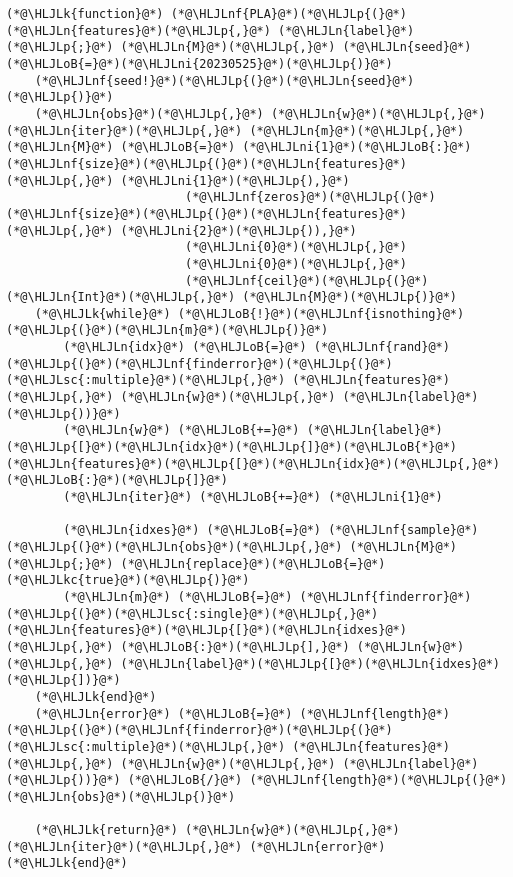 \documentclass[12pt,a4paper]{article}
\newcommand{\HLJLk}[1]{\textcolor[RGB]{148,91,176}{\textbf{#1}}}
\newcommand{\HLJLkc}[1]{\textcolor[RGB]{59,151,46}{\textit{#1}}}
\newcommand{\HLJLn}[1]{#1}
\newcommand{\HLJLnf}[1]{\textcolor[RGB]{66,102,213}{#1}}
\newcommand{\HLJLsc}[1]{\textcolor[RGB]{201,61,57}{#1}}
\newcommand{\HLJLni}[1]{\textcolor[RGB]{59,151,46}{#1}}
\newcommand{\HLJLoB}[1]{\textcolor[RGB]{102,102,102}{\textbf{#1}}}
\newcommand{\HLJLp}[1]{#1}
\begin{document}
\begin{lstlisting}
(*@\HLJLk{function}@*) (*@\HLJLnf{PLA}@*)(*@\HLJLp{(}@*)(*@\HLJLn{features}@*)(*@\HLJLp{,}@*) (*@\HLJLn{label}@*)(*@\HLJLp{;}@*) (*@\HLJLn{M}@*)(*@\HLJLp{,}@*) (*@\HLJLn{seed}@*)(*@\HLJLoB{=}@*)(*@\HLJLni{20230525}@*)(*@\HLJLp{)}@*)
    (*@\HLJLnf{seed!}@*)(*@\HLJLp{(}@*)(*@\HLJLn{seed}@*)(*@\HLJLp{)}@*)
    (*@\HLJLn{obs}@*)(*@\HLJLp{,}@*) (*@\HLJLn{w}@*)(*@\HLJLp{,}@*) (*@\HLJLn{iter}@*)(*@\HLJLp{,}@*) (*@\HLJLn{m}@*)(*@\HLJLp{,}@*) (*@\HLJLn{M}@*) (*@\HLJLoB{=}@*) (*@\HLJLni{1}@*)(*@\HLJLoB{:}@*)(*@\HLJLnf{size}@*)(*@\HLJLp{(}@*)(*@\HLJLn{features}@*)(*@\HLJLp{,}@*) (*@\HLJLni{1}@*)(*@\HLJLp{),}@*) 
                         (*@\HLJLnf{zeros}@*)(*@\HLJLp{(}@*)(*@\HLJLnf{size}@*)(*@\HLJLp{(}@*)(*@\HLJLn{features}@*)(*@\HLJLp{,}@*) (*@\HLJLni{2}@*)(*@\HLJLp{)),}@*) 
                         (*@\HLJLni{0}@*)(*@\HLJLp{,}@*) 
                         (*@\HLJLni{0}@*)(*@\HLJLp{,}@*)
                         (*@\HLJLnf{ceil}@*)(*@\HLJLp{(}@*)(*@\HLJLn{Int}@*)(*@\HLJLp{,}@*) (*@\HLJLn{M}@*)(*@\HLJLp{)}@*)
    (*@\HLJLk{while}@*) (*@\HLJLoB{!}@*)(*@\HLJLnf{isnothing}@*)(*@\HLJLp{(}@*)(*@\HLJLn{m}@*)(*@\HLJLp{)}@*)
        (*@\HLJLn{idx}@*) (*@\HLJLoB{=}@*) (*@\HLJLnf{rand}@*)(*@\HLJLp{(}@*)(*@\HLJLnf{finderror}@*)(*@\HLJLp{(}@*)(*@\HLJLsc{:multiple}@*)(*@\HLJLp{,}@*) (*@\HLJLn{features}@*)(*@\HLJLp{,}@*) (*@\HLJLn{w}@*)(*@\HLJLp{,}@*) (*@\HLJLn{label}@*)(*@\HLJLp{))}@*)
        (*@\HLJLn{w}@*) (*@\HLJLoB{+=}@*) (*@\HLJLn{label}@*)(*@\HLJLp{[}@*)(*@\HLJLn{idx}@*)(*@\HLJLp{]}@*)(*@\HLJLoB{*}@*)(*@\HLJLn{features}@*)(*@\HLJLp{[}@*)(*@\HLJLn{idx}@*)(*@\HLJLp{,}@*) (*@\HLJLoB{:}@*)(*@\HLJLp{]}@*)
        (*@\HLJLn{iter}@*) (*@\HLJLoB{+=}@*) (*@\HLJLni{1}@*)

        (*@\HLJLn{idxes}@*) (*@\HLJLoB{=}@*) (*@\HLJLnf{sample}@*)(*@\HLJLp{(}@*)(*@\HLJLn{obs}@*)(*@\HLJLp{,}@*) (*@\HLJLn{M}@*)(*@\HLJLp{;}@*) (*@\HLJLn{replace}@*)(*@\HLJLoB{=}@*)(*@\HLJLkc{true}@*)(*@\HLJLp{)}@*)
        (*@\HLJLn{m}@*) (*@\HLJLoB{=}@*) (*@\HLJLnf{finderror}@*)(*@\HLJLp{(}@*)(*@\HLJLsc{:single}@*)(*@\HLJLp{,}@*) (*@\HLJLn{features}@*)(*@\HLJLp{[}@*)(*@\HLJLn{idxes}@*)(*@\HLJLp{,}@*) (*@\HLJLoB{:}@*)(*@\HLJLp{],}@*) (*@\HLJLn{w}@*)(*@\HLJLp{,}@*) (*@\HLJLn{label}@*)(*@\HLJLp{[}@*)(*@\HLJLn{idxes}@*)(*@\HLJLp{])}@*)
    (*@\HLJLk{end}@*)
    (*@\HLJLn{error}@*) (*@\HLJLoB{=}@*) (*@\HLJLnf{length}@*)(*@\HLJLp{(}@*)(*@\HLJLnf{finderror}@*)(*@\HLJLp{(}@*)(*@\HLJLsc{:multiple}@*)(*@\HLJLp{,}@*) (*@\HLJLn{features}@*)(*@\HLJLp{,}@*) (*@\HLJLn{w}@*)(*@\HLJLp{,}@*) (*@\HLJLn{label}@*)(*@\HLJLp{))}@*) (*@\HLJLoB{/}@*) (*@\HLJLnf{length}@*)(*@\HLJLp{(}@*)(*@\HLJLn{obs}@*)(*@\HLJLp{)}@*)

    (*@\HLJLk{return}@*) (*@\HLJLn{w}@*)(*@\HLJLp{,}@*) (*@\HLJLn{iter}@*)(*@\HLJLp{,}@*) (*@\HLJLn{error}@*)
(*@\HLJLk{end}@*)
\end{lstlisting}
\end{document}
